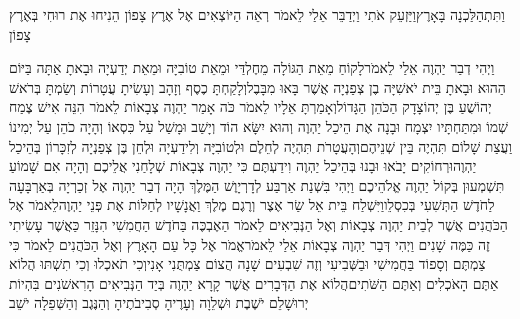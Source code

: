 \documentclass[../main/main.tex]{subfiles}
\begin{document}
\begin{multicols*}{\ncols}
וַתִּתְהַלַּכְנָה בָּאָרֶץ\PreVerseSpace{}וַיַּזְעֵק אֹתִי וַיְדַבֵּר אֵלַי לֵאמֹר רְאֵה הַיּוֹצְאִים אֶל אֶרֶץ צָפוֹן הֵנִיחוּ אֶת רוּחִי בְּאֶרֶץ צָפוֹן\OpenSection{}\par
{}וַיְהִי דְבַר יַהְוֶה אֵלַי לֵאמֹר\PreVerseSpace{}לָקוֹחַ מֵאֵת הַגּוֹלָה מֵחֶלְדַּי וּמֵאֵת טוֹבִיָּה וּמֵאֵת יְדַעְיָה וּבָאתָ אַתָּה בַּיּוֹם הַהוּא וּבָאתָ בֵּית יֹאשִׁיָּה בֶן צְפַנְיָה אֲשֶׁר בָּאוּ מִבָּבֶל\PreVerseSpace{}וְלָקַחְתָּ כֶסֶף וְזָהָב וְעָשִׂיתָ עֲטָרוֹת וְשַׂמְתָּ בְּרֹאשׁ יְהוֹשֻׁעַ בֶּן יְהוֹצָדָק הַכֹּהֵן הַגָּדוֹל\PreVerseSpace{}וְאָמַרְתָּ אֵלָיו לֵאמֹר כֹּה אָמַר יַהְוֶה צְבָאוֹת לֵאמֹר הִנֵּה אִישׁ צֶמַח שְׁמוֹ וּמִתַּחְתָּיו יִצְמָח וּבָנָה אֶת הֵיכַל יַהְוֶה\PreVerseSpace{} וְהוּא יִשָּׂא הוֹד וְיָשַׁב וּמָשַׁל עַל כִּסְאוֹ וְהָיָה כֹהֵן עַל יְמִינוֹ\SubEnd{} וַעֲצַת שָׁלוֹם תִּהְיֶה בֵּין שְׁנֵיהֶם\PreVerseSpace{}וְהָעֲטָרֹת תִּהְיֶה לְחֵלֶם וּלְטוֹבִיָּה וְלִידַעְיָה וּלְחֵן בֶּן צְפַנְיָה לְזִכָּרוֹן בְּהֵיכַל יַהְוֶה\PreVerseSpace{}וּרְחוֹקִים יָבֹאוּ וּבָנוּ בְּהֵיכַל יַהְוֶה וִידַעְתֶּם כִּי יַהְוֶה צְבָאוֹת שְׁלָחַנִי אֲלֵיכֶם וְהָיָה אִם שָׁמוֹעַ תִּשְׁמְעוּן בְּקוֹל יַהְוֶה אֱלֹהֵיכֶם \ClosedSection{}וַיְהִי בִּשְׁנַת אַרְבַּע לְדָרְיָוֶשׁ הַמֶּלֶךְ הָיָה דְבַר יַהְוֶה אֶל זְכַרְיָה בְּאַרְבָּעָה לַחֹדֶשׁ הַתְּשִׁעִי בְּכִסְלֵו\PreVerseSpace{}וַיִּשְׁלַח בֵּית אֵל שַׂר אֶצֶר וְרֶגֶם מֶלֶךְ וַאֲנָשָׁיו לְחַלּוֹת אֶת פְּנֵי יַהְוֶה\PreVerseSpace{}לֵאמֹר אֶל הַכֹּהֲנִים אֲשֶׁר לְבֵית יַהְוֶה צְבָאוֹת וְאֶל הַנְּבִיאִים לֵאמֹר הַאֶבְכֶּה בַּחֹדֶשׁ הַחֲמִשִׁי הִנָּזֵר כַּאֲשֶׁר עָשִׂיתִי זֶה כַּמֶּה שָׁנִים \ClosedSection{}וַיְהִי דְּבַר יַהְוֶה צְבָאוֹת אֵלַי לֵאמֹר\PreVerseSpace{}אֱמֹר אֶל כָּל עַם הָאָרֶץ וְאֶל הַכֹּהֲנִים לֵאמֹר כִּי צַמְתֶּם וְסָפוֹד בַּחֲמִישִׁי וּבַשְּׁבִיעִי וְזֶה שִׁבְעִים שָׁנָה הֲצוֹם צַמְתֻּנִי אָנִי\PreVerseSpace{}וְכִי תֹאכְלוּ וְכִי תִשְׁתּוּ הֲלוֹא אַתֶּם הָאֹכְלִים וְאַתֶּם הַשֹּׁתִים\PreVerseSpace{}הֲלוֹא אֶת הַדְּבָרִים אֲשֶׁר קָרָא יַהְוֶה בְּיַד הַנְּבִיאִים הָרִאשֹׁנִים בִּהְיוֹת יְרוּשָׁלֵם יֹשֶׁבֶת וּשְׁלֵוָה וְעָרֶיהָ סְבִיבֹתֶיהָ וְהַנֶּגֶב וְהַשְּׁפֵלָה יֹשֵׁב\OpenSection{}\par

\end{multicols*}
\end{document}
